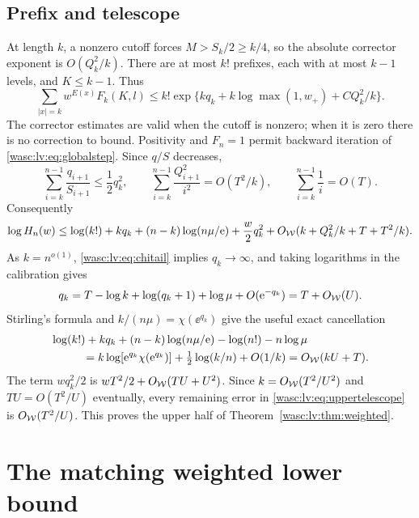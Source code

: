 \documentclass[11pt,a4paper]{article}
\theoremstyle{remark}\newtheorem{remark}[theorem]{Remark}
\numberwithin{equation}{section}
\begin{document}
\subsection{Prefix and telescope}
At length $k$, a nonzero cutoff forces $M>S_k/2\ge k/4$, so the absolute corrector exponent is $O(Q_k^2/k)$. There are at most $k!$ prefixes, each with at most $k-1$ levels, and $K\le k-1$. Thus
\begin{equation}\label{wasc:lv:eq:upperprefix}
\sum_{|x|=k}w^{E(x)}F_k(K,l)
\le k!\exp\{kq_k+k\log\max(1,w_+)+CQ_k^2/k\}.
\end{equation}
The corrector estimates are valid when the cutoff is nonzero; when it is zero there is no correction to bound.
Positivity and $F_n=1$ permit backward iteration of \eqref{wasc:lv:eq:globalstep}. Since $q/S$ decreases,
\[
\sum_{i=k}^{n-1}\frac{q_{i+1}}{S_{i+1}}\le\frac12q_k^2,
\qquad\sum_{i=k}^{n-1}\frac{Q_{i+1}^2}{i^2}=O(T^2/k),\qquad
\sum_{i=k}^{n-1}\frac1i=O(T).
\]
Consequently
\begin{equation}\label{wasc:lv:eq:uppertelescope}
\log H_n(w)\le\log(k!)+kq_k+(n-k)\log(n\mu/\mathrm e)+\frac w2q_k^2
+O_{\mathcal W}(k+Q_k^2/k+T+T^2/k).
\end{equation}
As $k=n^{o(1)}$, \eqref{wasc:lv:eq:chitail} implies $q_k\to\infty$, and taking logarithms in the calibration gives
\[
q_k=T-\log k+\log(q_k+1)+\log\mu+O(\mathrm e^{-q_k})
=T+O_{\mathcal W}(U).
\]
Stirling's formula and $k/(n\mu)=\chi(\ee^{q_k})$ give the useful exact cancellation
\begin{align}\label{wasc:lv:eq:uppercancel}
&\log(k!)+kq_k+(n-k)\log(n\mu/\ee)-\log(n!)-n\log\mu\notag\\
&\hspace{10mm}=k\log[\ee^{q_k}\chi(\ee^{q_k})]+\tfrac12\log(k/n)+O(1/k)
=O_{\Wc}(kU+T).
\end{align}
The term $wq_k^2/2$ is $wT^2/2+O_{\mathcal W}(TU+U^2)$. Since $k=O_{\mathcal W}(T^2/U^2)$ and $TU=O(T^2/U)$ eventually, every remaining error in \eqref{wasc:lv:eq:uppertelescope} is $O_{\mathcal W}(T^2/U)$. This proves the upper half of Theorem~\ref{wasc:lv:thm:weighted}.

\section{The matching weighted lower bound}\label{wasc:lv:sec:lower}
\end{document}
